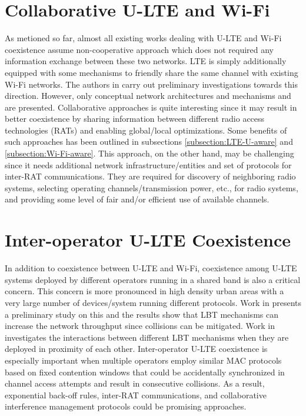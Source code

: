 \section{Collaborative U-LTE and Wi-Fi}
As metioned so far, almost all existing works dealing with U-LTE and Wi-Fi coexistence assume non-cooperative approach which does not required any information exchange between these two networks. LTE is simply additionally equipped with some mechanisms to friendly share the same channel with existing Wi-Fi networks. The authors in \cite{U-LTE-5G-2015, Coordinated-LTE-U-Wi-Fi-2015} carry out preliminary investigations towards this direction. However, only conceptual network architectures and mechanisms and are presented. Collaborative approaches is quite interesting since it may result in better coexistence by sharing information between different radio access technologies (RATs) and enabling global/local optimizations. Some benefits of such approaches has been outlined in subsections \ref{subsection:LTE-U-aware} and \ref{subsection:Wi-Fi-aware}. This approach, on the other hand, may be challenging since it needs additional network infrastructure/entities and set of protocols for inter-RAT communications. They are required for discovery of neighboring radio systems, selecting operating channels/transmission power, etc., for radio systems, and providing some level of fair and/or efficient use of available channels. 

\section{Inter-operator U-LTE Coexistence}
In addition to coexistence between U-LTE and Wi-Fi, coexistence among U-LTE systems deployed by different operators running in a shared band is also a critical concern. This concern is more pronounced in high density urban areas with a very large number of devices/system running different protocols. Work in \cite{LTE-U-ICC-WS-2015} presents a preliminary study on this and the results show that LBT mechanisms can increase the network throughput since collisions can be mitigated. Work in \cite{Enhanced-LTE-U-thesis-2015} investigates the interactions between different LBT mechanisms when they are deployed in proximity of each other. Inter-operator U-LTE coexistence is especially important when multiple operators employ similar MAC protocols based on fixed contention windows that could be accidentally synchronized in channel access attempts and result in consecutive collisions. As a result, exponential back-off rules, inter-RAT communications, and collaborative interference management protocols could be promising approaches.

